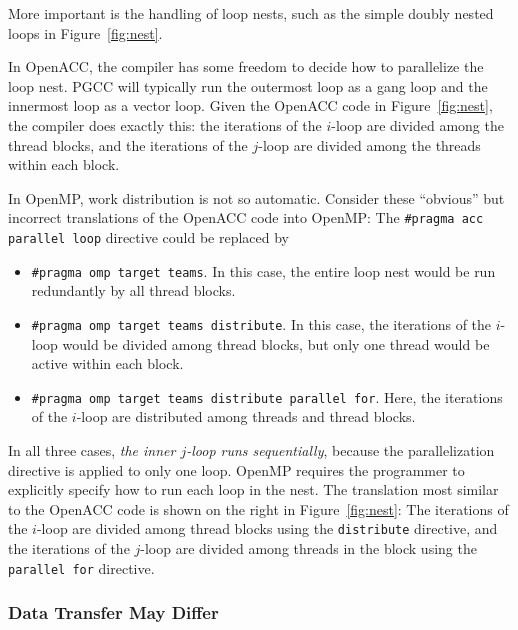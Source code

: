 \documentclass{sig-alternate-05-2015}
\begin{document}
More important is the handling of loop nests, such as the simple
doubly nested loops in Figure~\ref{fig:nest}.

In OpenACC, the compiler has some freedom to decide how to parallelize the loop
nest.  PGCC will typically run the outermost loop as a gang loop and the
innermost loop as a vector loop.  Given the OpenACC code in
Figure~\ref{fig:nest}, the compiler does exactly this: the iterations of the
$i$-loop are divided among the thread blocks, and the iterations of the
$j$-loop are divided among the threads within each block.

In OpenMP, work distribution is not so automatic.  Consider these
``obvious'' but incorrect translations of the OpenACC code into OpenMP: The
\texttt{\#pragma acc parallel loop} directive could be replaced by
\begin{itemize}
\item \texttt{\#pragma omp target teams}.  In this case, the entire loop
nest would be run redundantly by all thread blocks.
\item \texttt{\#pragma omp target teams distribute}.  In this case, the
iterations of the $i$-loop would be divided among thread blocks, but only
one thread would be active within each block.
\item \texttt{\#pragma omp target teams distribute parallel for}.  Here,
the iterations of the $i$-loop are distributed among threads and thread blocks.
\end{itemize}
In all three cases, \emph{the inner $j$-loop runs sequentially}, because the
parallelization directive is applied to only one loop.  OpenMP requires the
programmer to explicitly specify how to run each loop in the nest.  The
translation most similar to the OpenACC code is shown on the right in
Figure~\ref{fig:nest}: The iterations of the $i$-loop are divided among thread
blocks using the \texttt{distribute} directive, and the iterations of the
$j$-loop are divided among threads in the block using the \texttt{parallel for}
directive.



\subsubsection{Data Transfer May Differ}
\end{document}
